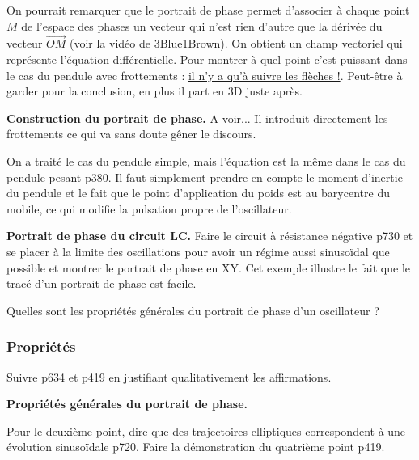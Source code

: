 \begin{remarque}
On pourrait remarquer que le portrait de phase permet d'associer à chaque point $M$ de l'espace des phases un vecteur qui n'est rien d'autre que la dérivée du vecteur $\overrightarrow{OM}$ (voir la \href{https://youtu.be/p_di4Zn4wz4?t=870}{vidéo de 3Blue1Brown}).
On obtient un champ vectoriel qui représente l'équation différentielle.
Pour montrer à quel point c'est puissant dans le cas du pendule avec frottements : \href{https://youtu.be/p_di4Zn4wz4?t=993}{il n'y a qu'à suivre les flèches !}.
Peut-être à garder pour la conclusion, en plus il part en 3D juste après.
\end{remarque}

\begin{slide}
\href{https://youtu.be/fDek6cYijxI?t=150}{\textbf{Construction du portrait de phase.}}
A voir...
Il introduit directement les frottements ce qui va sans doute gêner le discours.
\end{slide}

\begin{remarque}
On a traité le cas du pendule simple, mais l'équation est la même dans le cas du pendule pesant \cite{Bocquet2002} p380.
Il faut simplement prendre en compte le moment d'inertie du pendule et le fait que le point d'application du poids est au barycentre du mobile, ce qui modifie la pulsation propre de l'oscillateur.
\end{remarque}

\begin{experience}
\textbf{Portrait de phase du circuit LC.}
Faire le circuit à résistance négative \cite{Gie1992} p730 et se placer à la limite des oscillations pour avoir un régime aussi sinusoïdal que possible et montrer le portrait de phase en XY.
Cet exemple illustre le fait que le tracé d'un portrait de phase est facile.
\end{experience}

\begin{transition}
Quelles sont les propriétés générales du portrait de phase d'un oscillateur ?
\end{transition}

\subsubsection{Propriétés}

Suivre \cite{Salamito2016} p634 et \cite{Bocquet2002} p419 en justifiant qualitativement les affirmations.
\begin{slide}
\textbf{Propriétés générales du portrait de phase.}
\end{slide}
Pour le deuxième point, dire que des trajectoires elliptiques correspondent à une évolution sinusoïdale \cite{Gie1992} p720.
Faire la démonstration du quatrième point \cite{Bocquet2002} p419.

